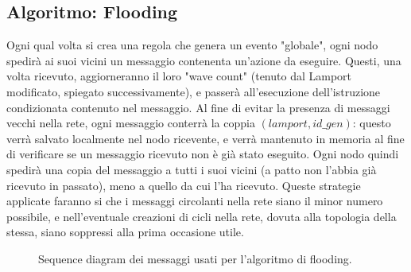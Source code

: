 \documentclass{memoir}
\begin{document}
\subsection{Algoritmo: Flooding}
Ogni qual volta si crea una regola che genera un evento "globale", ogni nodo spedirà
	   ai suoi vicini un messaggio contenenta un'azione da eseguire. Questi, una volta ricevuto,
	   aggiorneranno il loro "wave count" (tenuto dal Lamport modificato, spiegato successivamente),
	   e passerà all'esecuzione dell'istruzione condizionata contenuto nel messaggio. Al
	   fine di evitar la presenza di messaggi vecchi nella rete, ogni messaggio conterrà
	   la coppia $(lamport,id\_gen)$: questo verrà salvato localmente nel nodo ricevente,
	   e verrà mantenuto in memoria al fine di verificare se un messaggio ricevuto non
	   è già stato eseguito. Ogni nodo quindi spedirà una copia del messaggio a tutti
	   i suoi vicini (a patto non l'abbia già ricevuto in passato), meno a quello da cui
	   l'ha ricevuto. Queste strategie applicate faranno si che i messaggi circolanti nella
	   rete siano il minor numero possibile, e nell'eventuale creazioni di cicli nella rete,
	   dovuta alla topologia della stessa, siano soppressi alla prima occasione utile.

\begin{figure}[h]
\caption{Sequence diagram dei messaggi usati per l'algoritmo di flooding.}
\label{img:flooding}
\end{figure}
\end{document}
